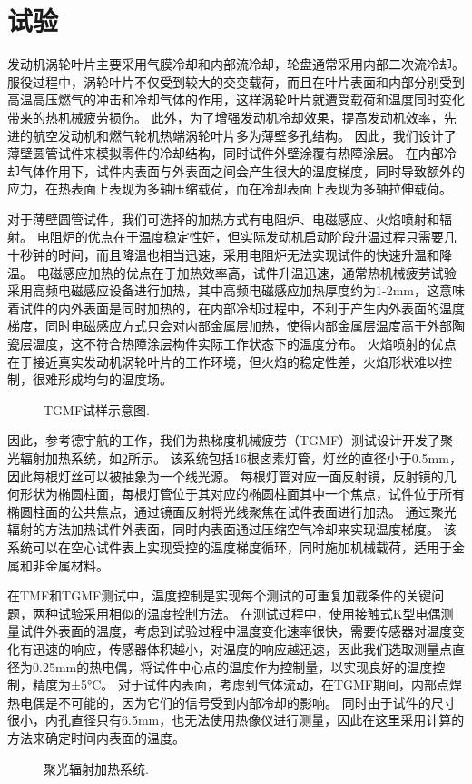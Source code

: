 \documentclass{article}
\begin{document}
\section{试验}

发动机涡轮叶片主要采用气膜冷却和内部流冷却，轮盘通常采用内部二次流冷却。
服役过程中，涡轮叶片不仅受到较大的交变载荷，而且在叶片表面和内部分别受到高温高压燃气的冲击和冷却气体的作用，这样涡轮叶片就遭受载荷和温度同时变化带来的热机械疲劳损伤。
此外，为了增强发动机冷却效果，提高发动机效率，先进的航空发动机和燃气轮机热端涡轮叶片多为薄壁多孔结构。
因此，我们设计了薄壁圆管试件来模拟零件的冷却结构，同时试件外壁涂覆有热障涂层。
在内部冷却气体作用下，试件内表面与外表面之间会产生很大的温度梯度，同时导致额外的应力，在热表面上表现为多轴压缩载荷，而在冷却表面上表现为多轴拉伸载荷。

对于薄壁圆管试件，我们可选择的加热方式有电阻炉、电磁感应、火焰喷射和辐射。
电阻炉的优点在于温度稳定性好，但实际发动机启动阶段升温过程只需要几十秒钟的时间，而且降温也相当迅速，采用电阻炉无法实现试件的快速升温和降温。
电磁感应加热的优点在于加热效率高，试件升温迅速，通常热机械疲劳试验采用高频电磁感应设备进行加热，其中高频电磁感应加热厚度约为1-2mm，这意味着试件的内外表面是同时加热的，在内部冷却过程中，不利于产生内外表面的温度梯度，同时电磁感应方式只会对内部金属层加热，使得内部金属层温度高于外部陶瓷层温度，这不符合热障涂层构件实际工作状态下的温度分布\cite{BRENDEL2008234}。
火焰喷射的优点在于接近真实发动机涡轮叶片的工作环境，但火焰的稳定性差，火焰形状难以控制，很难形成均匀的温度场\cite{MAUGET2017225}。

\begin{figure}[!htp]
\caption{TGMF试样示意图.}
\label{Fig:Specimen}
\end{figure}

因此，参考德宇航的工作\cite{BAUFELD2008219}，我们为热梯度机械疲劳（TGMF）测试设计开发了聚光辐射加热系统，如\ref{Fig:Radiation_Furnace2}所示。
该系统包括16根卤素灯管，灯丝的直径小于0.5mm，因此每根灯丝可以被抽象为一个线光源。
每根灯管对应一面反射镜，反射镜的几何形状为椭圆柱面，每根灯管位于其对应的椭圆柱面其中一个焦点，试件位于所有椭圆柱面的公共焦点，通过镜面反射将光线聚焦在试件表面进行加热。
通过聚光辐射的方法加热试件外表面，同时内表面通过压缩空气冷却来实现温度梯度。
该系统可以在空心试件表上实现受控的温度梯度循环，同时施加机械载荷，适用于金属和非金属材料。

在TMF和TGMF测试中，温度控制是实现每个测试的可重复加载条件的关键问题，两种试验采用相似的温度控制方法。
在测试过程中，使用接触式K型电偶测量试件外表面的温度，考虑到试验过程中温度变化速率很快，需要传感器对温度变化有迅速的响应，传感器体积越小，对温度的响应越迅速，因此我们选取测量点直径为0.25mm的热电偶，将试件中心点的温度作为控制量，以实现良好的温度控制，精度为±5°C。
对于试件内表面，考虑到气体流动，在TGMF期间，内部点焊热电偶是不可能的，因为它们的信号受到内部冷却的影响。
同时由于试件的尺寸很小，内孔直径只有6.5mm，也无法使用热像仪进行测量，因此在这里采用计算的方法来确定时间内表面的温度。
\begin{figure}[!htp]
\caption{聚光辐射加热系统.}
\label{Fig:Radiation_Furnace2}
\end{figure}
\end{document}
